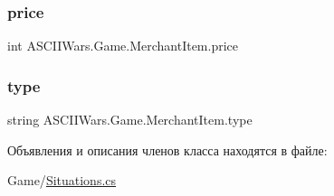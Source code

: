 \subsubsection{\texorpdfstring{price}{price}}
{\footnotesize\ttfamily int A\+S\+C\+I\+I\+Wars.\+Game.\+Merchant\+Item.\+price}

\hypertarget{class_a_s_c_i_i_wars_1_1_game_1_1_merchant_item_a0621b09ff9dc3029f660e32b90db815c}{}\label{class_a_s_c_i_i_wars_1_1_game_1_1_merchant_item_a0621b09ff9dc3029f660e32b90db815c} 
\subsubsection{\texorpdfstring{type}{type}}
{\footnotesize\ttfamily string A\+S\+C\+I\+I\+Wars.\+Game.\+Merchant\+Item.\+type}



Объявления и описания членов класса находятся в файле\+:\begin{DoxyCompactItemize}
\item 
Game/\hyperlink{_situations_8cs}{Situations.\+cs}\end{DoxyCompactItemize}
